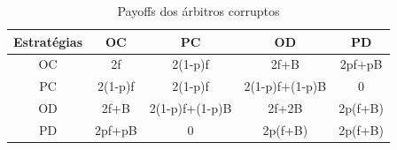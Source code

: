 \documentclass[conference, twocolumn]{IEEEtran}
\theoremstyle{plain}
\theoremstyle{definition}
\theoremstyle{remark}
\begin{document}
    \begin{table}[h]
        \centering
        \begin{tabular}{c|cccc}
            Estratégias&OC &PC &OD &PD\\
            \hline
            OC & 2f & 2(1-p)f & 2f+B & 2pf+pB\\
            PC & 2(1-p)f & 2(1-p)f & 2(1-p)f+(1-p)B & 0\\
            OD & 2f+B & 2(1-p)f+(1-p)B & 2f+2B & 2p(f+B)\\
            PD & 2pf+pB & 0 & 2p(f+B)         & 2p(f+B)\\
        \end{tabular}
        \caption{Payoffs dos árbitros corruptos}
    \end{table}
\end{document}

